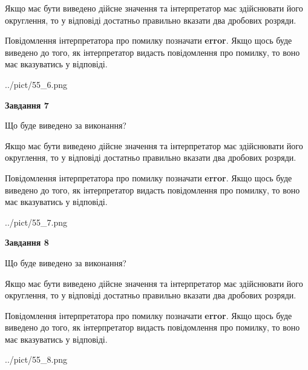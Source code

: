 \documentclass[12pt, ukrainian]{article}
\begin{document}
{\begin {Large}
Якщо має бути виведено дійсне значення та інтерпретатор має здійснювати його округлення, 
то у відповіді достатньо правильно вказати два дробових розряди.

Повідомлення інтерпретатора про помилку позначати \textbf{error}.
Якщо щось буде виведено до того, як інтерпретатор видасть повідомлення про помилку, 
то воно має вказуватись у відповіді. \par

\begin{center}
	{../pict/55_6.png}
\end{center}
\newpage

{\begin {center}\textbf{Завдання 7}\end {center}}\par
Що буде виведено за виконання? \par

Якщо має бути виведено дійсне значення та інтерпретатор має здійснювати його округлення, 
то у відповіді достатньо правильно вказати два дробових розряди.

Повідомлення інтерпретатора про помилку позначати \textbf{error}.
Якщо щось буде виведено до того, як інтерпретатор видасть повідомлення про помилку, 
то воно має вказуватись у відповіді. \par

\begin{center}
	{../pict/55_7.png}
\end{center}
\newpage

{\begin {center}\textbf{Завдання 8}\end {center}}\par
Що буде виведено за виконання? \par

Якщо має бути виведено дійсне значення та інтерпретатор має здійснювати його округлення, 
то у відповіді достатньо правильно вказати два дробових розряди.

Повідомлення інтерпретатора про помилку позначати \textbf{error}.
Якщо щось буде виведено до того, як інтерпретатор видасть повідомлення про помилку, 
то воно має вказуватись у відповіді. \par

\begin{center}
	{../pict/55_8.png}
\end{center}
\newpage


\end{Large}}
\end{document}
